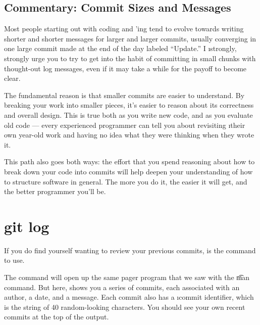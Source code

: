 \documentclass[letterpaper,12pt,titlepage,twoside]{article}
\begin{document}
\subsection*{Commentary: Commit Sizes and Messages}

Most people starting out with coding and \git'ing tend to evolve towards
writing shorter and shorter messages for larger and larger commits, usually
converging in one large commit made at the end of the day labeled ``Update.''
I \i{strongly, strongly urge} you to try to get into the habit of committing
in small chunks with thought-out log messages, even if it may take a while for
the payoff to become clear.

The fundamental reason is that smaller commits are easier to understand. By
breaking your work into smaller pieces, it's easier to reason about its
correctness and overall design. This is true both as you write new code, and
as you evaluate old code --- every experienced programmer can tell you about
revisiting \i{their own} year-old work and having no idea what they were
thinking when they wrote it.

This path also goes both ways: the effort that you spend reasoning about how
to break down your code into commits will help deepen your understanding of
how to structure software in general. The more you do it, the easier it will
get, and the better programmer you'll be.


\section{git log}

If you do find yourself wanting to review your previous commits, 
is the command to use.


The  command will open up the same pager program that we saw with the
\t{man} command. But here,  shows you a series of commits, each
associated with an author, a date, and a message. Each commit also has a
\i{commit identifier}, which is the string of 40 random-looking characters.
You should see your own recent commits at the top of the output.


\end{document}
